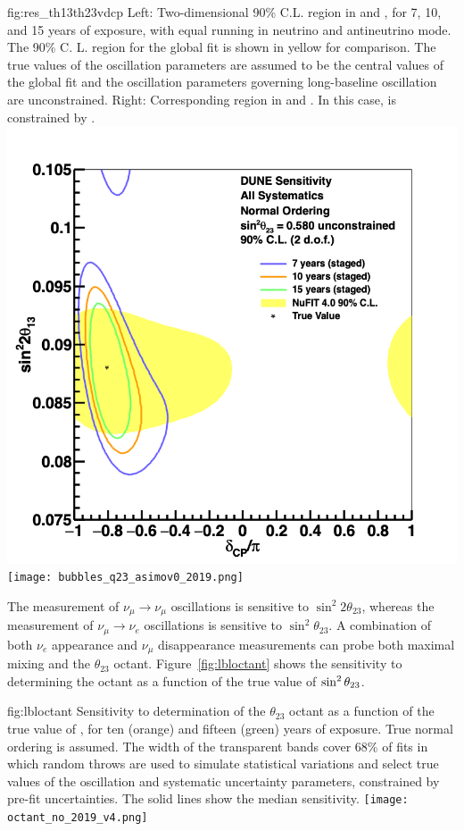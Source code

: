 \begin{dunefigure}
{fig:res_th13th23vdcp}
{Left: Two-dimensional 90\% C.L. region in  and \deltacp, for 7, 10, and 15 years of exposure, with equal running in neutrino and antineutrino mode. The 90\% C. L. region for the  global fit is shown in yellow for comparison. The true values of the oscillation parameters are assumed to be the central values of the  global fit and the oscillation parameters governing long-baseline oscillation are unconstrained.  Right: Corresponding region in  and \deltacp.  
In this case,  is constrained by .
}
		\includegraphics[width=0.5\linewidth]{graphics/bubbles_q13_2019_fulldisclosure.png}\hfill
		\texttt{[image: bubbles\_q23\_asimov0\_2019.png]}
\end{dunefigure}
%

The measurement of $\nu_\mu \rightarrow \nu_\mu$ oscillations is sensitive to $\sin ^2 2 \theta_{23}$, whereas the measurement of $\nu_\mu \rightarrow \nu_e$ oscillations is sensitive to $\sin^2 \theta_{23}$.  A combination of both $\nu_e$ appearance and $\nu_\mu$ disappearance measurements can probe both maximal mixing and
the $\theta_{23}$ octant.  
Figure~\ref{fig:lbloctant} shows the sensitivity to determining the octant as a function of the true value of $\sin^2\theta_{23}$.

\begin{dunefigure}
{fig:lbloctant}
{Sensitivity to determination of the $\theta_{23}$ octant as a function of the true value of , for ten (orange) and fifteen (green) years of exposure. True normal ordering is assumed. The width of the transparent bands cover 68\% of fits in which random throws are used to simulate statistical variations and select true values of the oscillation and systematic uncertainty parameters, constrained by pre-fit uncertainties. The solid lines show the median sensitivity.}
		\texttt{[image: octant\_no\_2019\_v4.png]}
\end{dunefigure}


